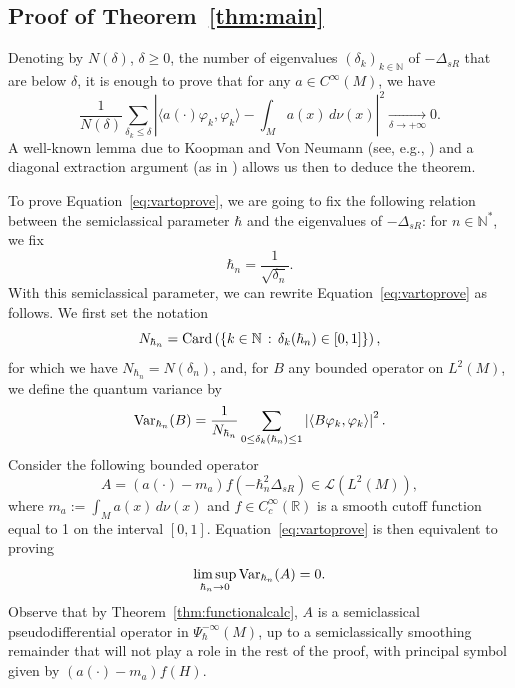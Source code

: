\documentclass[12pt,a4paper]{amsart}
\theoremstyle{plain}
\theoremstyle{definition}
\theoremstyle{remark}
\numberwithin{equation}{section}
\theoremstyle{definition}
\def\R{{\mathbb R}}%
\def\N{{\mathbb N}}%
\def\Tend#1#2{\mathop{\longrightarrow}\limits_{#1\rightarrow#2}}
\numberwithin{equation}{section}
\begin{document}
\subsection{Proof of Theorem~\ref{thm:main}}
\label{subsect:proofmain}

Denoting by $N(\delta)$, $\delta \geq 0$, the number of eigenvalues $(\delta_k)_{k\in\N}$ of $-\Delta_{sR}$ that are below $\delta$, it is enough to prove that for any $a\in C^\infty(M)$, we have
\begin{equation}
    \label{eq:vartoprove}
    \frac{1}{N(\delta)} \sum_{\delta_{k}\leq \delta}\left|\langle a(\cdot)\varphi_k,\varphi_k\rangle - \int_{M}a(x)\,d\nu(x)\right|^2\Tend{\delta}{+\infty} 0.
\end{equation}
A well-known lemma due to Koopman and Von Neumann (see, e.g., \cite[Chapter 2.6, Lemma 6.2]{Pet}) and a diagonal extraction argument (as in \cite[Theorem 1.5]{Zwo}) allows us then to deduce the theorem.
        
To prove Equation~\eqref{eq:vartoprove}, we are going to fix the following relation between the semiclassical parameter $\hbar$ and the eigenvalues of $-\Delta_{sR}$: for $n\in\N^*$, we fix
\begin{equation*}
    \hbar_n = \frac{1}{\sqrt{\delta_n}}.
\end{equation*}
With this semiclassical parameter, we can rewrite Equation~\eqref{eq:vartoprove} as follows. We first set the notation
\begin{equation*}
    N_{\hbar_n} = {\rm Card}\left(\{k\in\N\,:\,\delta_k(\hbar_n) \in [0,1]\}\right),
\end{equation*}
for which we have $N_{\hbar_n} = N(\delta_n)$, and, for $B$ any bounded operator on $L^2(M)$, we define the quantum variance by
\begin{equation*}
    {\rm Var}_{\hbar_n}(B) = \frac{1}{N_{\hbar_n}}\sum_{0\leq \delta_k(\hbar_n)\leq 1} \left|\langle B\varphi_k,\varphi_k\rangle\right|^2.
\end{equation*}
Consider the following bounded operator 
\begin{equation*}
    A = \left(a(\cdot)- m_a\right)f(-\hbar_n^2\Delta_{sR}) \in \mathcal{L}(L^2(M)),
\end{equation*}
where $m_a := \int_{M}a(x)\,d\nu(x)$ and $f\in C_c^\infty(\R)$ is a smooth cutoff function equal to 1 on the interval $[0,1]$. Equation~\eqref{eq:vartoprove} is then equivalent to proving
\begin{equation*}
    \limsup_{\hbar_n\rightarrow 0} {\rm Var}_{\hbar_n}(A) = 0.
\end{equation*}
Observe that by Theorem~\ref{thm:functionalcalc}, $A$ is a semiclassical pseudodifferential operator in $\Psi_\hbar^{-\infty}(M)$, up to a semiclassically smoothing remainder that will not play a role in the rest of the proof, with principal symbol given by $(a(\cdot)-m_a)f(H)$.
\end{document}
